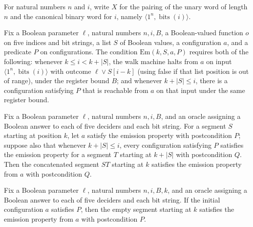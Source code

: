 \begin{definition}
\label{BoolCircuit.AdjWalk.X}
\leanok
{}
For natural numbers $n$ and $i$, write $X$ for the pairing of the unary word of length
$n$ and the canonical binary word for $i$, namely $\langle
1^n,\operatorname{bits}(i)\rangle$.
\end{definition}

\begin{definition}
\label{BoolCircuit.AdjWalk.Em}
\leanok
{}
Fix a Boolean parameter $\ell$, natural numbers $n,i,B$, a Boolean-valued function $o$
on five indices and bit strings, a list $S$ of Boolean values, a configuration $a$, and
a predicate $P$ on configurations. The condition $\mathrm{Em}(k,S,a,P)$ requires both of
the following: whenever $k\le i<k+|S|$, the walk machine halts from $a$ on input
$\langle 1^n,\operatorname{bits}(i)\rangle$ with outcome $\ell\lor S[i-k]$ (using false
if that list position is out of range), under the register bound $B$; and whenever
$k+|S|\le i$, there is a configuration satisfying $P$ that is reachable from $a$ on that
input under the same register bound.
\end{definition}

\begin{lemma}
\label{BoolCircuit.AdjWalk.Em.append}
\leanok
{}
Fix a Boolean parameter $\ell$, natural numbers $n,i,B$, and an oracle assigning a
Boolean answer to each of five deciders and each bit string. For a segment $S$ starting
at position $k$, let $a$ satisfy the emission property with postcondition $P$; suppose
also that whenever $k+|S|\le i$, every configuration satisfying $P$ satisfies the
emission property for a segment $T$ starting at $k+|S|$ with postcondition $Q$. Then the
concatenated segment $S T$ starting at $k$ satisfies the emission property from $a$ with
postcondition $Q$.
\end{lemma}

\begin{lemma}
\label{BoolCircuit.AdjWalk.Em.nil}
\leanok
{}
Fix a Boolean parameter $\ell$, natural numbers $n,i,B,k$, and an oracle assigning a
Boolean answer to each of five deciders and each bit string. If the initial
configuration $a$ satisfies $P$, then the empty segment starting at $k$ satisfies the
emission property from $a$ with postcondition $P$.
\end{lemma}

